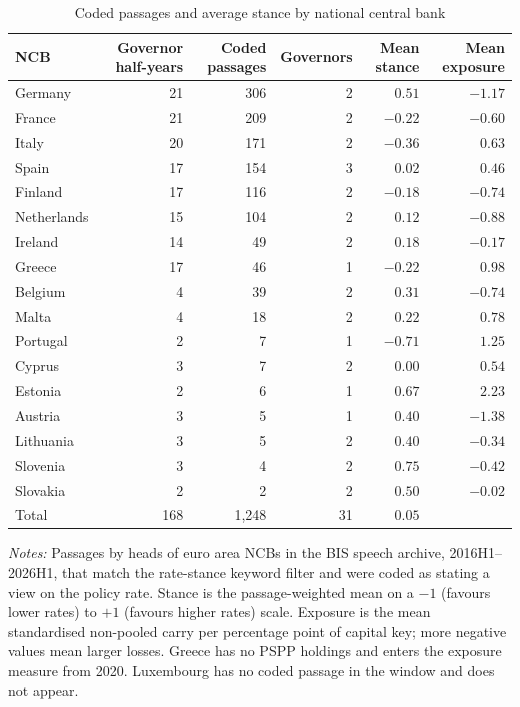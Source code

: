 \documentclass[11pt]{article}
\theoremstyle{plain}
\begin{document}
\begin{table}[t]\centering\small
\begin{threeparttable}
\caption{Coded passages and average stance by national central bank}\label{tab:desc}
\begin{tabular}{lrrrrr}
\toprule
NCB & Governor half-years & Coded passages & Governors & Mean stance & Mean exposure \\
\midrule
Germany & 21 & 306 & 2 & $0.51$ & $-1.17$ \\
France & 21 & 209 & 2 & $-0.22$ & $-0.60$ \\
Italy & 20 & 171 & 2 & $-0.36$ & $0.63$ \\
Spain & 17 & 154 & 3 & $0.02$ & $0.46$ \\
Finland & 17 & 116 & 2 & $-0.18$ & $-0.74$ \\
Netherlands & 15 & 104 & 2 & $0.12$ & $-0.88$ \\
Ireland & 14 & 49 & 2 & $0.18$ & $-0.17$ \\
Greece & 17 & 46 & 1 & $-0.22$ & $0.98$ \\
Belgium & 4 & 39 & 2 & $0.31$ & $-0.74$ \\
Malta & 4 & 18 & 2 & $0.22$ & $0.78$ \\
Portugal & 2 & 7 & 1 & $-0.71$ & $1.25$ \\
Cyprus & 3 & 7 & 2 & $0.00$ & $0.54$ \\
Estonia & 2 & 6 & 1 & $0.67$ & $2.23$ \\
Austria & 3 & 5 & 1 & $0.40$ & $-1.38$ \\
Lithuania & 3 & 5 & 2 & $0.40$ & $-0.34$ \\
Slovenia & 3 & 4 & 2 & $0.75$ & $-0.42$ \\
Slovakia & 2 & 2 & 2 & $0.50$ & $-0.02$ \\
\midrule
Total & 168 & 1{,}248 & 31 & $0.05$ & \\
\bottomrule
\end{tabular}
\begin{tablenotes}\footnotesize
\item \textit{Notes:} Passages by heads of euro area NCBs in the BIS speech archive, 2016H1--2026H1, that match the rate-stance keyword filter and were coded as stating a view on the policy rate. Stance is the passage-weighted mean on a $-1$ (favours lower rates) to $+1$ (favours higher rates) scale. Exposure is the mean standardised non-pooled carry per percentage point of capital key; more negative values mean larger losses. Greece has no PSPP holdings and enters the exposure measure from 2020. Luxembourg has no coded passage in the window and does not appear.
\end{tablenotes}
\end{threeparttable}
\end{table}
\end{document}
